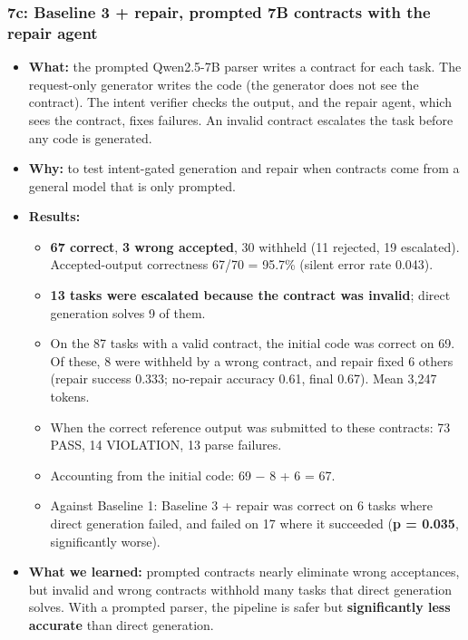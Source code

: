 \documentclass[11pt]{article}
\providecommand{\tightlist}{\setlength{\itemsep}{0pt}\setlength{\parskip}{0pt}}
\begin{document}
\subsubsection{7c: Baseline 3 + repair, prompted 7B contracts with the
repair agent}

\begin{itemize}
\tightlist
\item
  \textbf{What:} the prompted Qwen2.5-7B parser writes a contract for
  each task. The request-only generator writes the code (the generator
  does not see the contract). The intent verifier checks the output, and
  the repair agent, which sees the contract, fixes failures. An invalid
  contract escalates the task before any code is generated.
\item
  \textbf{Why:} to test intent-gated generation and repair when
  contracts come from a general model that is only prompted.
\item
  \textbf{Results:}

  \begin{itemize}
  \tightlist
  \item
    \textbf{67 correct}, \textbf{3 wrong accepted}, 30 withheld (11
    rejected, 19 escalated). Accepted-output correctness 67/70 = 95.7\%
    (silent error rate 0.043).
  \item
    \textbf{13 tasks were escalated because the contract was invalid};
    direct generation solves 9 of them.
  \item
    On the 87 tasks with a valid contract, the initial code was correct
    on 69. Of these, 8 were withheld by a wrong contract, and repair
    fixed 6 others (repair success 0.333; no-repair accuracy 0.61, final
    0.67). Mean 3,247 tokens.
  \item
    When the correct reference output was submitted to these contracts:
    73 PASS, 14 VIOLATION, 13 parse failures.
  \item
    Accounting from the initial code: 69 − 8 + 6 = 67.
  \item
    Against Baseline 1: Baseline 3 + repair was correct on 6 tasks where
    direct generation failed, and failed on 17 where it succeeded
    (\textbf{p = 0.035}, significantly worse).
  \end{itemize}
\item
  \textbf{What we learned:} prompted contracts nearly eliminate wrong
  acceptances, but invalid and wrong contracts withhold many tasks that
  direct generation solves. With a prompted parser, the pipeline is
  safer but \textbf{significantly less accurate} than direct generation.
\end{itemize}
\end{document}
